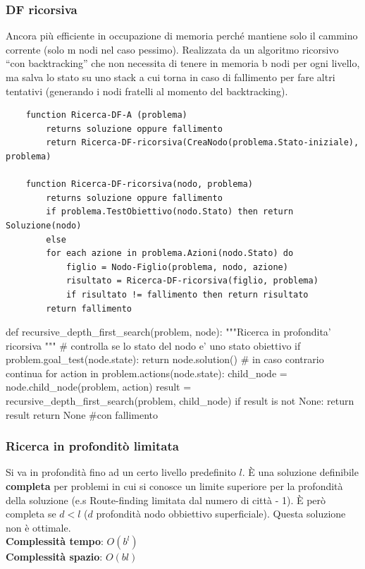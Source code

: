 \subsubsection{DF ricorsiva}
Ancora più efficiente in occupazione di memoria perché mantiene solo il cammino corrente (solo m nodi nel caso pessimo).
Realizzata da un algoritmo ricorsivo “con backtracking” che non necessita di tenere in memoria b nodi per ogni livello, ma salva lo stato su uno stack a cui torna in caso di fallimento 
per fare altri tentativi (generando i nodi fratelli al momento del backtracking).
\begin{lstlisting}
	function Ricerca-DF-A (problema)
		returns soluzione oppure fallimento
		return Ricerca-DF-ricorsiva(CreaNodo(problema.Stato-iniziale), problema)
		
	function Ricerca-DF-ricorsiva(nodo, problema)
		returns soluzione oppure fallimento
		if problema.TestObiettivo(nodo.Stato) then return Soluzione(nodo)
		else
		for each azione in problema.Azioni(nodo.Stato) do
			figlio = Nodo-Figlio(problema, nodo, azione)
			risultato = Ricerca-DF-ricorsiva(figlio, problema)
			if risultato != fallimento then return risultato
		return fallimento
\end{lstlisting}
\begin{python}
	def recursive_depth_first_search(problem, node):
		"""Ricerca in profondita' ricorsiva """
		# controlla se lo stato del nodo e' uno stato obiettivo
		if problem.goal_test(node.state):
			return node.solution()
		# in caso contrario continua
		for action in problem.actions(node.state):
			child_node = node.child_node(problem, action)
			result = recursive_depth_first_search(problem, child_node)
			if result is not None:
				return result
		return None #con fallimento
\end{python}

\subsubsection{Ricerca in profonditò limitata}
Si va in profondità fino ad un certo livello predefinito $l$. È una soluzione definibile
\textbf{completa} per problemi in cui si conosce un limite superiore per la profondità della soluzione 
(e.s Route-finding limitata dal numero di città - 1). È però completa se $d < l$ ($d$ profondità nodo obbiettivo
superficiale). Questa soluzione non è ottimale.\\
\textbf{Complessità tempo}: $O(b^l)$\\
\textbf{Complessità spazio}: $O(bl)$\\

